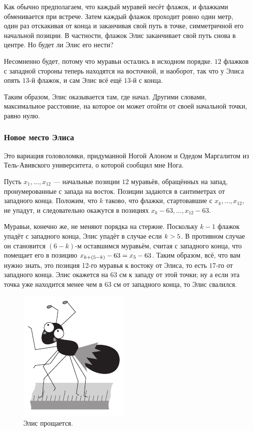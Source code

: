 Как обычно предполагаем, что каждый муравей несёт флажок, и флажками обменивается при встрече.
Затем каждый флажок проходит ровно один метр, один раз отскакивая от конца и заканчивая свой путь в точке, симметричной его начальной позиции.
В частности, флажок Элис заканчивает свой путь снова в центре. Но будет ли Элис его нести?

Несомненно будет, потому что муравьи остались в исходном порядке.
$12$ флажков с западной стороны теперь находятся на восточной, и наоборот, так что у Элиса опять $13$-й флажок, и сам Элис всё ещё $13$-й с конца.

Таким образом, Элис оказывается там, где начал.
Другими словами, максимальное расстояние, на которое он может отойти от своей начальной точки, равно нулю.

\subsubsection*{Новое место Элиса}

Это вариация головоломки, придуманной Ногой Алоном и Одедом Маргалитом из Тель-Авивского университета, о которой сообщил мне Нога.

Пусть $x_1,\dots,x_{12}$ --- начальные позиции $12$ муравьёв, обращённых на запад, пронумерованные с запада на восток.
Позиции задаются в сантиметрах от западного конца.
Положим, что $k$ таково, что флажки, стартовавшие с $x_k,\dots,x_{12}$, не упадут, и следовательно окажутся в позициях $x_k-63,\dots,x_{12}-63$.

Муравьи, конечно же, не меняют порядка на стержне.
Поскольку $k-1$ флажок упадёт с западного конца, Элис упадёт в случае если $k\z> 5$.
В противном случае он становится $(6-k)$-м оставшимся муравьём, считая с западного конца, что помещает его в позицию $x_{k+(5-k)}-63\z=x_5-63$.
Таким образом, всё, что вам нужно знать, это позиция 12-го муравья к востоку от Элиса, то есть $17$-го от западного конца.
Элис окажется на $63$ см к западу от этой точки;
ну а если эта точка уже находится менее чем в $63$ см от западного конца, то Элис свалился.

\begin{figure}[ht!]
\centering
\includegraphics[scale=1]{pics/alice2}
\caption{Элис прощается.}
\label{pic:alice2}
\end{figure}
